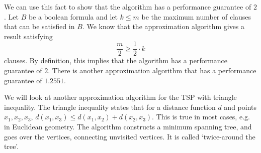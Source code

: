 \documentclass[a4paper, openany]{memoir}
\begin{document}
    We can use this fact to show that the algorithm has a performance guarantee of $2$. Let $B$ be a boolean formula and let $k \leq m$ be the maximum number of clauses that can be satisfied in $B$. We know that the approximation algorithm gives a result satisfying 
    \[\frac{m}{2} \geq \frac{1}{2} \cdot k\]
    clauses. By definition, this implies that the algorithm has a performance guarantee of $2$. There is another approximation algorithm that has a performance guarantee of $1.2551$.

    We will look at another approximation algorithm for the TSP with triangle inequality. The triangle inequality states that for a distance function $d$ and points $x_1, x_2, x_3$, $d(x_1, x_3) \leq d(x_1, x_2) + d(x_2, x_3)$. This is true in most cases, e.g. in Euclidean geometry. The algorithm constructs a minimum spanning tree, and goes over the vertices, connecting unvisited vertices. It is called `twice-around the tree'.
\end{document}
